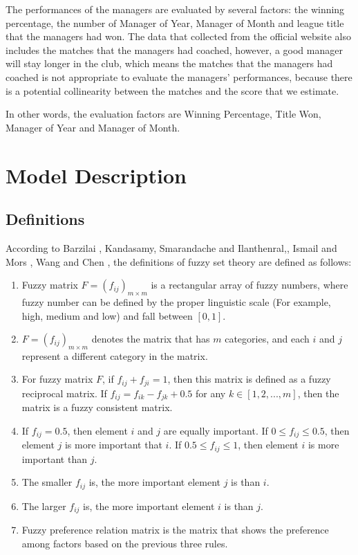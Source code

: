 \documentclass[12pt,a4paper]{article}
\begin{document}
    The performances of the managers are evaluated by several factors: the winning percentage, the number of Manager of Year, Manager of Month and league title that the managers had won. The data that collected from the official website also includes the matches that the managers had coached, however, a good manager will stay longer in the club, which means the matches that the managers had coached is not appropriate to evaluate the managers' performances, because there is a potential collinearity between the matches and the score that we estimate.
    
    In other words, the evaluation factors are Winning Percentage, Title Won, Manager of Year and Manager of Month.
    
\section{Model Description}

	
\subsection{Definitions}

	According to Barzilai \citeyear{barzilai1998consistency}, Kandasamy, Smarandache and Ilanthenral,\citeyear{kandasamy2007elementary},  Ismail and Mors \citeyear{ismail1991fuzzy}, Wang and Chen \citeyear{wang2005new}, the definitions of fuzzy set theory are defined as follows:

	\begin{enumerate}
		\item Fuzzy matrix $F=(f_{ij})_{m\times m}$ is a rectangular array of fuzzy numbers, where fuzzy number can be defined by the proper linguistic scale (For example, high, medium and low) and fall between $[0,1]$.
		\item $F=(f_{ij})_{m\times m}$ denotes the matrix that has $m$ categories, and each $i$ and $j$ represent a different category in the matrix.
		\item For fuzzy matrix $F$, if $f_{ij}+f_{ji}=1$, then this matrix is defined as a fuzzy reciprocal matrix. If $f_{ij}=f_{ik}-f_{jk}+0.5$ for any $k\in [1,2,...,m]$, then the matrix is a fuzzy consistent matrix.
		\item If $f_{ij}=0.5$, then element $i$ and $j$ are equally important. If $0\le f_{ij}\le 0.5$, then element $j$ is more important that $i$. If $0.5\le f_{ij}\le 1$, then element $i$ is more important than $j$.
		\item The smaller $f_{ij}$ is, the more important element $j$ is than $i$.
		\item The larger $f_{ij}$ is, the more important element $i$ is than $j$.
		\item Fuzzy preference relation matrix is the matrix that shows the preference among factors based on the previous three rules.
	\end{enumerate}
	
\end{document}
